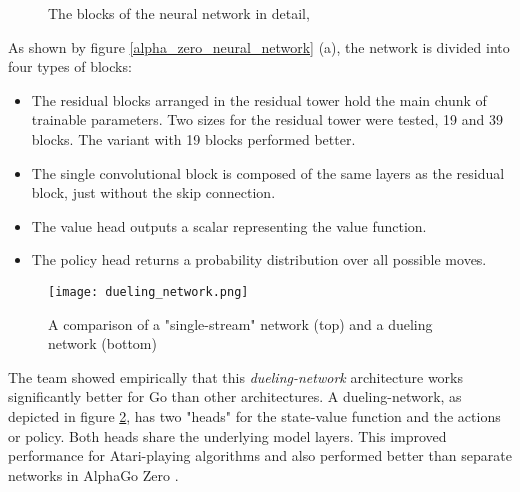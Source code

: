 \begin{figure}[!h]
    \centering
    \hfill
    \hfill
    \caption{The blocks of the neural network in detail, \cite[cf. p. 27ff.]{silver_mastering_2017}}
    \label{alpha_zero_blocks}
\end{figure}

As shown by figure \ref{alpha_zero_neural_network} (a), the network is divided into four types of blocks:

\begin{itemize}
    \item The residual blocks arranged in the residual tower hold the main chunk of trainable parameters. Two sizes for the residual tower were tested, 19 and 39 blocks. The variant with 19 blocks performed better.
    \item The single convolutional block is composed of the same layers as the residual block, just without the skip connection.
    \item The value head outputs a scalar representing the value function.
    \item The policy head returns a probability distribution over all possible moves.
\end{itemize}

\begin{figure}
    \centering
    \texttt{[image: dueling\_network.png]}
    \caption{A comparison of a "single-stream" network (top) and a dueling network (bottom) \cite{wang_dueling_2016}}
    \label{dueling_network}
\end{figure}

The team showed empirically \cite[p. 9]{silver_mastering_2017} that this \textit{dueling-network} \cite{wang_dueling_2016} architecture works significantly better for Go than other architectures. A dueling-network, as depicted in figure \ref{dueling_network}, has two "heads" for the state-value function and the actions or policy. Both heads share the underlying model layers. This improved performance for Atari-playing algorithms \cite[p. 7]{wang_dueling_2016} and also performed better than separate networks in AlphaGo Zero \cite[p. 9]{silver_mastering_2017}.

